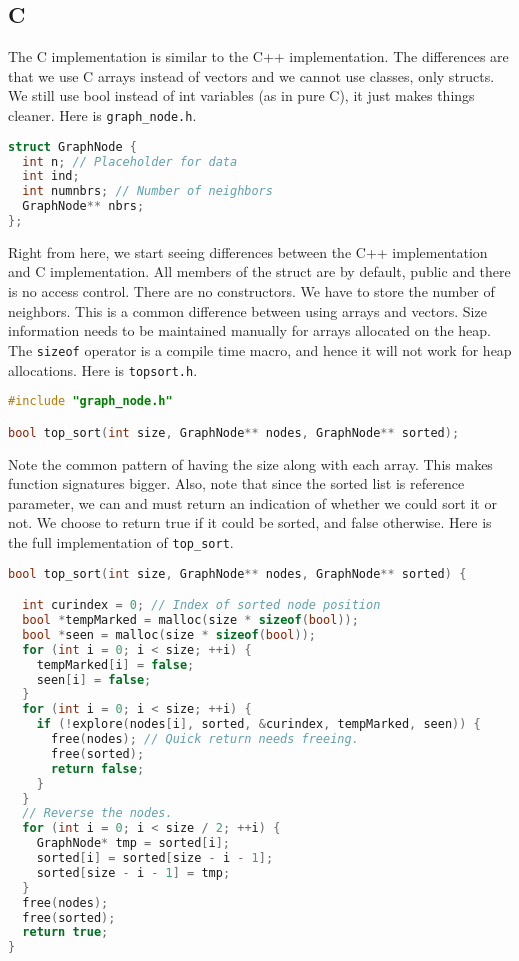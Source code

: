 \subsection{C}
The C implementation is similar to the C++ implementation. The differences 
are that we use C arrays instead of vectors and we cannot use classes, only
structs. We still use bool instead of int variables (as in pure C), it just 
makes things cleaner. Here is \verb+graph_node.h+.
\begin{lstlisting}[language=c++]
struct GraphNode {
  int n; // Placeholder for data
  int ind;
  int numnbrs; // Number of neighbors
  GraphNode** nbrs;
};
\end{lstlisting}
Right from here, we start seeing differences between the C++ implementation
and C implementation. All members of the struct are by default, public and 
there is no access control. There are no constructors. We have to store the
number of neighbors. This is a common difference between using arrays and
vectors. Size information needs to be maintained manually for arrays allocated
on the heap. The \verb+sizeof+ operator is a compile time macro, and hence 
it will not work for heap allocations. Here is \verb+topsort.h+.
\begin{lstlisting}[language=c++]
#include "graph_node.h"

bool top_sort(int size, GraphNode** nodes, GraphNode** sorted);
\end{lstlisting}
Note the common pattern of having the size along with each array. This makes 
function signatures bigger. Also, note that since the sorted list is reference
parameter, we can and must return an indication of whether we could sort it 
or not. We choose to return true if it could be sorted, and false otherwise.
Here is the full implementation of \verb+top_sort+.
\begin{lstlisting}[language=c++]
bool top_sort(int size, GraphNode** nodes, GraphNode** sorted) {

  int curindex = 0; // Index of sorted node position
  bool *tempMarked = malloc(size * sizeof(bool));
  bool *seen = malloc(size * sizeof(bool));
  for (int i = 0; i < size; ++i) {
    tempMarked[i] = false;
    seen[i] = false;
  }
  for (int i = 0; i < size; ++i) {
    if (!explore(nodes[i], sorted, &curindex, tempMarked, seen)) {
      free(nodes); // Quick return needs freeing.
      free(sorted);
      return false;
    }
  }
  // Reverse the nodes.
  for (int i = 0; i < size / 2; ++i) {
	GraphNode* tmp = sorted[i];
	sorted[i] = sorted[size - i - 1];
	sorted[size - i - 1] = tmp;
  }
  free(nodes);
  free(sorted);
  return true;
}
\end{lstlisting}

